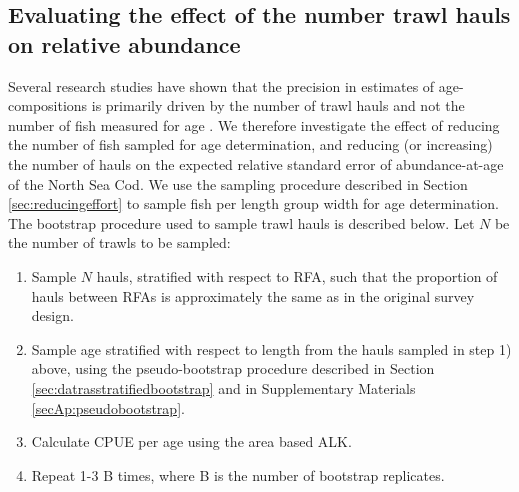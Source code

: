\documentclass[a4paper 12pt]{article}
\numberwithin{equation}{section}
\begin{document}
\subsection{Evaluating the effect of the number trawl hauls on relative abundance}
\label{sec:evaluatingtrawlhauls}
Several research studies have shown that the precision in estimates of age-compositions is primarily driven by the number of trawl hauls and not the number of fish measured for age \citep{aanes2015efficient, sondre2003estimating, stewart2014bootstrapping}. We therefore investigate the effect of reducing the number of fish sampled for age determination, and reducing (or increasing) the number of hauls on the expected relative standard error of abundance-at-age of the North Sea Cod. We use the sampling procedure described in Section \ref{sec:reducingeffort} to sample fish per length group width for age determination. The bootstrap procedure used to sample trawl hauls is described below. Let $N$ be the number of trawls to be sampled:
\begin{enumerate}
\item Sample $N$ hauls, stratified with respect to RFA, such that the proportion of hauls between RFAs is approximately the same as in the original survey design.
\item Sample age stratified with respect to length from the hauls sampled in step 1) above, using the pseudo-bootstrap procedure described in Section \ref{sec:datrasstratifiedbootstrap} and in Supplementary Materials \ref{secAp:pseudobootstrap}.
\item Calculate CPUE per age using the area based ALK.
\item Repeat 1-3 B times, where B is the number of bootstrap replicates.
\end{enumerate}

\end{document}
